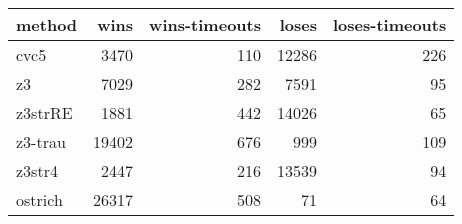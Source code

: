 \begin{tabular}{lrrrr}
\hline
 method   &   wins &   wins-timeouts &   loses &   loses-timeouts \\
\hline
 cvc5     &   3470 &             110 &   12286 &              226 \\
 z3       &   7029 &             282 &    7591 &               95 \\
 z3strRE  &   1881 &             442 &   14026 &               65 \\
 z3-trau  &  19402 &             676 &     999 &              109 \\
 z3str4   &   2447 &             216 &   13539 &               94 \\
 ostrich  &  26317 &             508 &      71 &               64 \\
\hline
\end{tabular}
